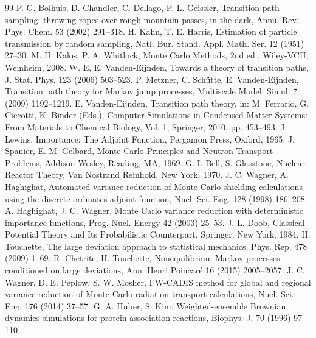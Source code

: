 \documentclass[a4paper,fleqn]{cas-sc}
\begin{document}
\printcredits

\begin{thebibliography}{99}
 P. G. Bolhuis, D. Chandler, C. Dellago, P. L. Geissler, Transition path
sampling: throwing ropes over rough mountain passes, in the dark, Annu. Rev. Phys. Chem. 53 (2002)
291--318.
 H. Kahn, T. E. Harris, Estimation of particle transmission by random sampling,
Natl. Bur. Stand. Appl. Math. Ser. 12 (1951) 27--30.
 M. H. Kalos, P. A. Whitlock, Monte Carlo Methods, 2nd ed., Wiley-VCH,
Weinheim, 2008.
 W. E, E. Vanden-Eijnden, Towards a theory of transition paths, J. Stat. Phys. 123
(2006) 503--523.
 P. Metzner, C. Sch\"utte, E. Vanden-Eijnden, Transition path theory for
Markov jump processes, Multiscale Model. Simul. 7 (2009) 1192--1219.
 E. Vanden-Eijnden, Transition path theory, in: M. Ferrario,
G. Ciccotti, K. Binder (Eds.), Computer Simulations in Condensed Matter Systems: From Materials to
Chemical Biology, Vol. 1, Springer, 2010, pp. 453--493.
 J. Lewins, Importance: The Adjoint Function, Pergamon Press, Oxford, 1965.
 J. Spanier, E. M. Gelbard, Monte Carlo Principles and Neutron Transport
Problems, Addison-Wesley, Reading, MA, 1969.
 G. I. Bell, S. Glasstone, Nuclear Reactor Theory, Van Nostrand Reinhold,
New York, 1970.
 J. C. Wagner, A. Haghighat, Automated variance reduction of Monte Carlo
shielding calculations using the discrete ordinates adjoint function, Nucl. Sci. Eng. 128 (1998)
186--208.
 A. Haghighat, J. C. Wagner, Monte Carlo variance reduction with
deterministic importance functions, Prog. Nucl. Energy 42 (2003) 25--53.
 J. L. Doob, Classical Potential Theory and Its Probabilistic Counterpart,
Springer, New York, 1984.
 H. Touchette, The large deviation approach to statistical mechanics,
Phys. Rep. 478 (2009) 1--69.
 R. Chetrite, H. Touchette, Nonequilibrium Markov processes conditioned on
large deviations, Ann. Henri Poincar\'e 16 (2015) 2005--2057.
 J. C. Wagner, D. E. Peplow, S. W. Mosher, FW-CADIS method for global and
regional variance reduction of Monte Carlo radiation transport calculations, Nucl. Sci. Eng. 176
(2014) 37--57.
 G. A. Huber, S. Kim, Weighted-ensemble Brownian dynamics simulations for
protein association reactions, Biophys. J. 70 (1996) 97--110.

\end{thebibliography}
\end{document}
